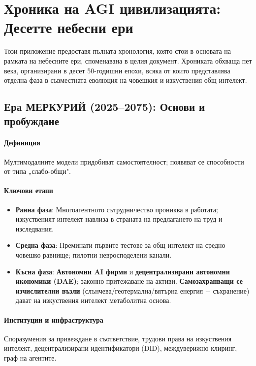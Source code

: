 \documentclass[11pt]{article}
\begin{document}
\appendix
\newpage

\section{Хроника на AGI цивилизацията: Десетте небесни ери}
\label{appendix:chronicle}

Този приложение предоставя пълната хронология, която стои в основата на рамката на небесните ери, споменавана в целия документ. Хрониката обхваща пет века, организирани в десет 50-годишни епохи, всяка от които представлява отделна фаза в съвместната еволюция на човешкия и изкуствения общ интелект.

\subsection{Ера МЕРКУРИЙ (2025–2075): Основи и пробуждане}
\paragraph{Дефиниция} Мултимодалните модели придобиват самостоятелност; появяват се способности от типа „слабо-общи".

\paragraph{Ключови етапи}
\begin{itemize}[noitemsep]
  \item \textbf{Ранна фаза}: Многоагентното сътрудничество прониква в работата; изкуственият интелект навлиза в страната на предлагането на труд и изследвания.
  \item \textbf{Средна фаза}: Преминати първите тестове за общ интелект на средно човешко равнище; пилотни невросподелени канали.
  \item \textbf{Късна фаза}: \textbf{Автономни AI фирми} и \textbf{децентрализирани автономни икономики (DAE)}; законно притежаване на активи. \textbf{Самозахранващи се изчислителни възли} (слънчева/геотермална/вятърна енергия + съхранение) дават на изкуствения интелект метаболитна основа.
\end{itemize}

\paragraph{Институции и инфраструктура} Споразумения за привеждане в съответствие, трудови права на изкуствения интелект, децентрализирани идентификатори (DID), междуверижно клиринг, граф на агентите.
\end{document}
